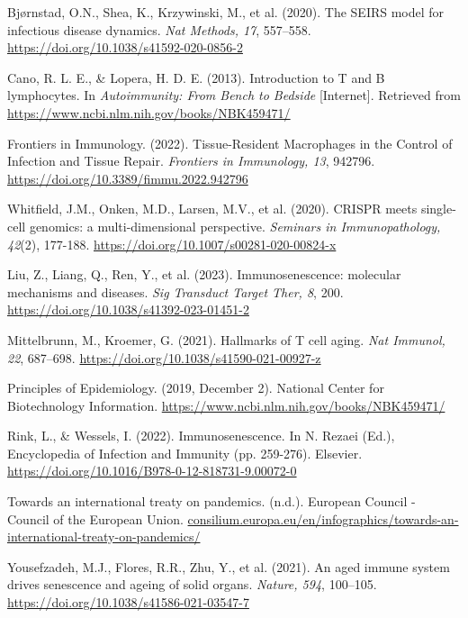 \documentclass{report}
\begin{document}
\begin{thebibliography}{}

Bjørnstad, O.N., Shea, K., Krzywinski, M., et al. (2020). The SEIRS model for infectious disease dynamics. \textit{Nat Methods, 17}, 557–558. \url{https://doi.org/10.1038/s41592-020-0856-2}

Cano, R. L. E., \& Lopera, H. D. E. (2013). Introduction to T and B lymphocytes. In \textit{Autoimmunity: From Bench to Bedside} [Internet]. Retrieved from \url{https://www.ncbi.nlm.nih.gov/books/NBK459471/}

Frontiers in Immunology. (2022). Tissue-Resident Macrophages in the Control of Infection and Tissue Repair. \textit{Frontiers in Immunology, 13}, 942796. \url{https://doi.org/10.3389/fimmu.2022.942796}

Whitfield, J.M., Onken, M.D., Larsen, M.V., et al. (2020). CRISPR meets single-cell genomics: a multi-dimensional perspective. \textit{Seminars in Immunopathology, 42}(2), 177-188. \url{https://doi.org/10.1007/s00281-020-00824-x}

Liu, Z., Liang, Q., Ren, Y., et al. (2023). Immunosenescence: molecular mechanisms and diseases. \textit{Sig Transduct Target Ther, 8}, 200. \url{https://doi.org/10.1038/s41392-023-01451-2}

Mittelbrunn, M., Kroemer, G. (2021). Hallmarks of T cell aging. \textit{Nat Immunol, 22}, 687–698. \url{https://doi.org/10.1038/s41590-021-00927-z}

Principles of Epidemiology. (2019, December 2). National Center for Biotechnology Information. \url{https://www.ncbi.nlm.nih.gov/books/NBK459471/}

Rink, L., \& Wessels, I. (2022). Immunosenescence. In N. Rezaei (Ed.), Encyclopedia of Infection and Immunity (pp. 259-276). Elsevier. \url{https://doi.org/10.1016/B978-0-12-818731-9.00072-0}

Towards an international treaty on pandemics. (n.d.). European Council - Council of the European Union. \url{consilium.europa.eu/en/infographics/towards-an-international-treaty-on-pandemics/}

Yousefzadeh, M.J., Flores, R.R., Zhu, Y., et al. (2021). An aged immune system drives senescence and ageing of solid organs. \textit{Nature, 594}, 100–105. \url{https://doi.org/10.1038/s41586-021-03547-7}

\end{thebibliography}
\end{document}

